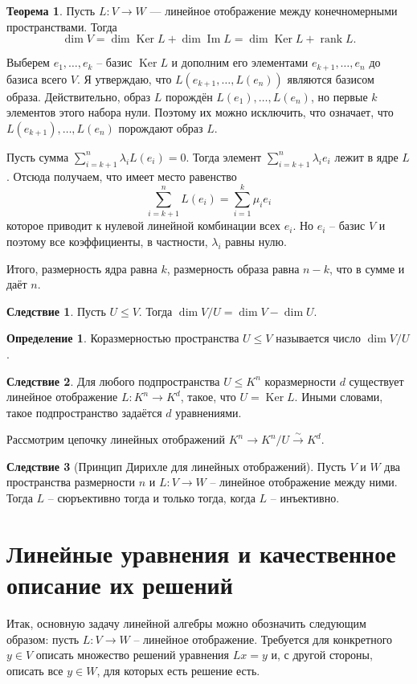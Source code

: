 \documentclass[10pt,a4paper,oneside]{book} %
\theoremstyle{definition}
\newtheorem*{defn}{Определение}
\newtheorem{thm}{Теорема}
\newtheorem{cor}{Следствие}
\newcommand{\rank}{\operatorname{rank}}
\DeclareMathOperator{\Ker}{Ker}
\newcommand{\im}{\operatorname{Im}}
\def\dfn{\begin{defn}}
\def\edfn{\end{defn}}
\def\crl{\begin{cor}}
\def\ecrl{\end{cor}}
\begin{document}
\begin{thm}
Пусть $L\colon V \to W$ --- линейное отображение между конечномерными пространствами. Тогда 
$$\dim V= \dim \Ker L +  \dim \im L= \dim \Ker L +\rank L.$$
\end{thm}
\proof Выберем $e_1,\dots, e_k$ -- базис $\Ker L$ и дополним его элементами $e_{k+1},\dots,e_n$ до базиса всего $V$. Я утверждаю, что $L(e_{k+1},\dots,L(e_n))$ являются базисом образа. Действительно, образ $L$ порождён $L(e_1),\dots, L(e_n)$, но первые $k$ элементов этого набора нули. Поэтому их можно исключить, что означает, что $L(e_{k+1}), \dots, L(e_n)$ порождают образ $L$. 

Пусть сумма $\sum_{i=k+1}^n \lambda_i L(e_i)=0$. Тогда элемент $\sum_{i=k+1}^n \lambda_i e_i $ лежит в ядре $L$. Отсюда получаем, что имеет место равенство $$\sum_{i=k+1}^n L(e_i) = \sum_{i=1}^k \mu_i e_i$$
которое приводит к нулевой линейной комбинации всех $e_i$. Но $e_i$ -- базис $V$ и поэтому все коэффициенты, в частности, $\lambda_i$ равны нулю. 

Итого, размерность ядра равна $k$, размерность образа равна $n-k$, что в сумме и даёт $n$.
\endproof

\crl Пусть $U \leq V$. Тогда $\dim V/U= \dim V - \dim U$.
\ecrl

\dfn Коразмерностью пространства $U \leq V$ называется число $\dim V/U$. 
\edfn

\crl Для любого подпространства $U \leq K^n$ коразмерности $d$ существует линейное отображение $L\colon K^n \to K^d$, такое, что $U=\Ker L$. Иными словами, такое подпространство задаётся $d$ уравнениями. 
\ecrl
\proof Рассмотрим цепочку линейных отображений $K^n \to K^n/U \stackrel{\sim}{\longrightarrow} K^d$.
\endproof 

\crl[Принцип Дирихле для линейных отображений] Пусть $V$ и $W$ два пространства размерности $n$ и $L \colon V \to W$ -- линейное отображение между ними. Тогда $L$ -- сюръективно тогда и только тогда, когда $L$ -- инъективно.
\ecrl




\section{Линейные уравнения и качественное описание их решений}
Итак, основную задачу линейной алгебры можно обозначить следующим образом: пусть $L\colon V \to W$ -- линейное отображение. Требуется для конкретного $y\in V$ описать множество решений уравнения $Lx=y$ и, с другой стороны, описать все $y\in W$, для которых есть решение есть.
\end{document}
